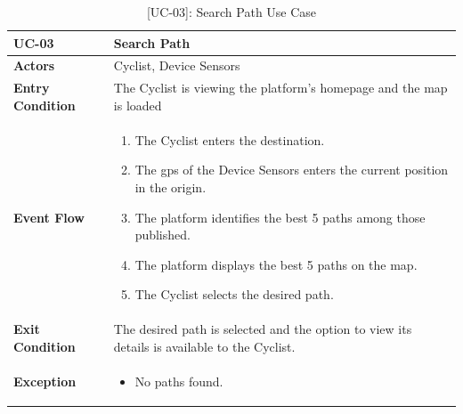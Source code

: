 \begin{table}[H]
    \centering
    \setlength\extrarowheight{2pt}
    \renewcommand{\arraystretch}{1.2}
    \begin{tabularx}{\textwidth}{|>{\bfseries}l|X|}
    \hline
    UC-03 & Search Path \\ \hline
    Actors & Cyclist, Device Sensors\\ \hline
    Entry Condition & The Cyclist is viewing the platform’s homepage and the map is loaded\\ \hline
    Event Flow & 
    \begin{enumerate}
      \item The Cyclist enters the destination.
      \item The gps of the Device Sensors enters the current position in the origin.
      \item The platform identifies the best 5 paths among those published.
      \item The platform displays the best 5 paths on the map.
      \item The Cyclist selects the desired path.
    \end{enumerate}
    \\ \hline
    Exit Condition &  The desired path is selected and the option to view its details is available to the Cyclist.\\ \hline
    Exception & 
    \begin{itemize}
        \item No paths found.
    \end{itemize}
    \\ \hline
        \end{tabularx}
    \caption{[UC-03]: Search Path Use Case }
    \label{UC-03}
\end{table} 

